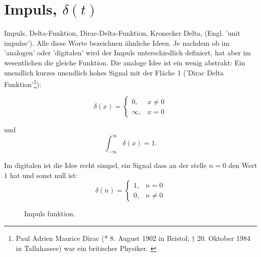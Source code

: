 \section{Impuls, $\delta(t)$}
Impuls, Delta-Funktion, Dirac-Delta-Funktion, Kronecker Delta, (Engl. 'unit impulse'). Alle diese Worte bezeichnen ähnliche Ideen. Je nachdem ob im 'analogen' oder 'digitalen' wird der Impuls unterschiedlich definiert, hat aber im wesentlichen die gleiche Funktion. Die analoge Idee ist ein wenig abstrakt: Ein unendlich kurzes unendlich hohes Signal mit der Fläche 1 ('Dirac Delta Funktion'\footnote{Paul Adrien Maurice Dirac (* 8. August 1902 in Bristol; † 20. Oktober 1984 in Tallahassee) war ein britischer Physiker. \citep{dewiki:251726014} }):

\begin{equation}
 \delta (x)={\begin{cases}0,&x\neq 0\\{\infty },&x=0\end{cases}}
\end{equation}

und 
\begin{equation}
\int _{-\infty }^{\infty }\delta (x)=1.
\end{equation}


Im digitalen ist die Idee recht simpel, ein Signal dass an der stelle $n=0$ den Wert $1$ hat und sonst null ist:
\begin{equation}
	\delta(n) =
	\begin{cases} 
		1, & n = 0 \\ 
		0, &  n \neq 0 
\end{cases}
\end{equation}

% 	


\begin{figure}[H]
    \centering
    \subfigure[Impuls]{
        
        \label{fig:delta}
    }
    \caption{Impuls funktion.}
    \label{fig:deltaVersions}
\end{figure}



